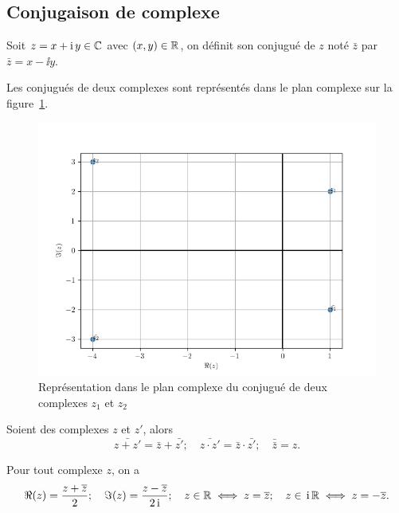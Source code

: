 \subsection{Conjugaison de complexe}\label{subsec:conjugaisoncomplexe}

\begin{defdef}
  Soit \(z = x + \operatorname{i}{}y \in{}\mathbb{C}\) avec \((x, y)\in{}\mathbb{R}\), on définit son conjugué
  de \(z\) noté \(\bar{z}\) par \(\bar{z} = x- \ii{}y\).
\end{defdef}
Les conjugués de deux complexes sont représentés dans le plan complexe sur la
figure~\ref{fig:conjugueComplexe}.

\begin{figure}
  \centering
  \includegraphics[scale = 0.8]{conjugue.png}
  \caption{Représentation dans le plan complexe du conjugué de deux complexes
  \(z_1\) et \(z_2\)}\label{fig:conjugueComplexe}
\end{figure}

\begin{prop}
  Soient des complexes \(z\) et \(z'\), alors
  \begin{equation}
    \bar{z + z'} = \bar{z} + \bar{z'}; \quad \bar{z \cdot z'} = \bar{z}
    \cdot \bar{z'}; \quad \bar{\bar{z}} = z.
  \end{equation}
\end{prop}

\begin{prop}
  Pour tout complexe \(z\), on a
  \begin{equation}
    \Re(z) = \frac{z + \overline{z}}{2}; \quad \Im(z) = \frac{z-\overline{z}}{2 \operatorname{i}};
    \quad z \in{}\mathbb{R} \iff z = \overline{z}; \quad z \in{}\operatorname{i}\mathbb{R} \iff z = -\overline{z}.
  \end{equation}
\end{prop}

